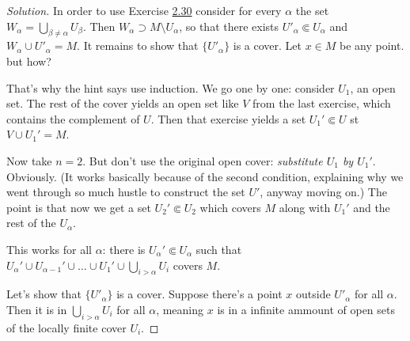 \begin{proof}[Solution]\leavevmode
In order to use Exercise \hyperref[exer:2.30]{2.30} consider for every \(\alpha\) the set \(W_\alpha=\bigcup_{\beta \neq  \alpha} U_\beta\). Then \(W_\alpha \supset M\setminus U_\alpha\), so that there exists \(U'_\alpha \Subset U_\alpha\) and \(W_\alpha \cup U'_\alpha=M\). It remains to show that \(\{U'_\alpha\}\) is a cover. Let \(x \in M\) be any point. but how?

That's why the hint says use induction. We go one by one: consider \(U_1\), an open set. The rest of the cover yields an open set like  \(V\) from the last exercise, which contains the complement of  \(U\). Then that exercise yields a set  \(U_1' \Subset U\) st \(V \cup  U_1' = M\).

Now take \(n=2\). But don't use the original open cover:  \textit{substitute \(U_1\) by \(U_1'\)}. Obviously. (It works basically because of the second condition, explaining why we went through so much hustle to construct the set \(U'\), anyway moving on.) The point is that now we get a set \(U_2' \Subset U_2\) which covers \(M\) along with \(U_1'\) and the rest of the \(U_\alpha\).

This works for all $\alpha$: there is \(U_\alpha' \Subset U_\alpha\) such that \(U_\alpha' \cup  U_{\alpha-1}' \cup  \ldots \cup U_1' \cup \bigcup_{i>\alpha}U_i\) covers \(M\).

Let's show that \(\{U'_\alpha\}\) is a cover. Suppose there's a point \(x\) outside \(U'_\alpha\) for all \(\alpha\). Then it is in \(\bigcup_{i>\alpha}U_i\) for all \(\alpha\), meaning 
\(x\) is in a infinite ammount of open sets of the locally finite cover \(U_i\).
\end{proof}



